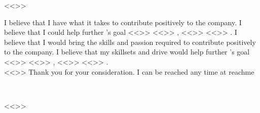 <<>>

    I believe that I have what it takes to contribute positively to the company.
    I believe that I could help further 's goal
    <<>>
        <<>>
        , 
        <<>>
    <<>>
    .
    I believe that I would bring the skills and passion required to contribute positively to the company.
    I believe that my skillsets and drive would help further 's goal
    <<>>
        <<>>
        , 
        <<>>
    <<>>
    .
\\


    <<>>
        Thank you for your consideration. I can be reached any time at {{reachme}}

    \hfill\\

<<>>



